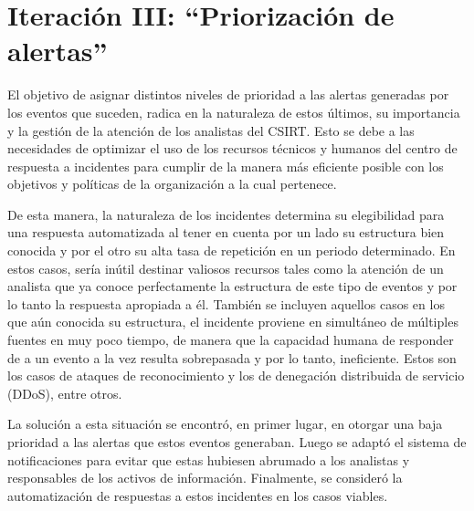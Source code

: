 \chapter{\Large Iteración III: “Priorización de alertas”}
    El objetivo de asignar distintos niveles de prioridad a las alertas generadas por los eventos que suceden, radica en la naturaleza de estos últimos, su importancia y la gestión de la atención de los analistas del CSIRT. Esto se debe a las necesidades de optimizar el uso de los recursos técnicos y humanos del centro de respuesta a incidentes para cumplir de la manera más eficiente posible con los objetivos y políticas de la organización a la cual pertenece. \par
    De esta manera, la naturaleza de los incidentes determina su elegibilidad para una respuesta automatizada al tener en cuenta por un lado su estructura bien conocida y por el otro su alta tasa de repetición en un periodo determinado. En estos casos, sería inútil destinar valiosos recursos tales como la atención de un analista que ya conoce perfectamente la estructura de este tipo de eventos y por lo tanto la respuesta apropiada a él. También se incluyen aquellos casos en los que aún conocida su estructura, el incidente proviene en simultáneo de múltiples fuentes en muy poco tiempo, de manera que la capacidad humana de responder de a un evento a la vez resulta sobrepasada y por lo tanto, ineficiente. Estos son los casos de ataques de reconocimiento y los de denegación distribuida de servicio (DDoS), entre otros. \par
    La solución a esta situación se encontró, en primer lugar, en otorgar una baja prioridad a las alertas que estos eventos generaban. Luego se adaptó el sistema de notificaciones para evitar que estas hubiesen abrumado a los analistas y responsables de los activos de información. Finalmente, se consideró la automatización de respuestas a estos incidentes en los casos viables. \par
